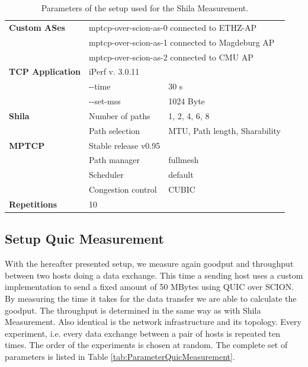 \begin{table} [H]
	\centering
	\caption{Parameters of the setup used for the Shila Measurement.}
	\begin{tabular}{lll} 
		\toprule
		\textbf{Custom ASes} 		& \multicolumn{2}{l}{mptcp-over-scion-as-0 connected to ETHZ-AP}				\\
							 		& \multicolumn{2}{l}{mptcp-over-scion-as-1 connected to Magdeburg AP}			\\
							 		& \multicolumn{2}{l}{mptcp-over-scion-as-2 connected to CMU AP}					\smallskip \\ 
		\textbf{TCP Application}	& iPerf v. 3.0.11								&								\\
									& -\vspace{0 px}-time										& 30 s				\\
									& -\vspace{0 px}-set-mss										& 1024 Byte		\smallskip	\\
		\textbf{Shila}				&  Number of paths								& 1, 2, 4, 6, 8					\\
									& Path selection				 				& MTU, Path length, Sharability \smallskip\\
		\textbf{MPTCP}				& Stable release v0.95							&								\\
									& Path manager									& fullmesh						\\
									& Scheduler										& default						\\
									& Congestion control							& CUBIC							\smallskip\\
		\textbf{Repetitions} 		& 10  											&								\\
		\bottomrule
	\end{tabular}
	\label{tab:ParameterShilaMeasurement}
\end{table}

\subsection*{Setup Quic Measurement}

With the hereafter presented setup, we measure again goodput and throughput between two hosts doing a data exchange. This time a sending host uses a custom implementation to send a fixed amount of 50 MBytes using QUIC over SCION. By measuring the time it takes for the data transfer we are able to calculate the goodput. The throughput is determined in the same way as with Shila Measurement. Also identical is the network infrastructure and its topology. Every experiment, i.e. every data exchange between a pair of hosts is repeated ten times. The order of the experiments is chosen at random. The complete set of parameters is listed in Table \ref{tab:ParameterQuicMeasurement}.

